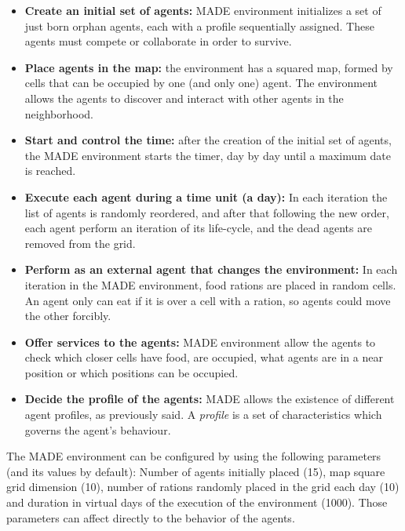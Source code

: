 \documentclass{sig-alternate}
\begin{document}
\begin{itemize}
\item \textbf{Create an initial set of agents:} MADE environment
  initializes a set of just born orphan agents, each with a profile
  sequentially assigned.
 These agents must compete or collaborate in order to survive.
\item \textbf{Place agents in the map:} the environment has a squared map, formed by cells that can be occupied by one (and only one) agent. The environment allows the agents to discover and interact with other agents in the neighborhood.
\item \textbf{Start and control the time:} after the creation of the initial set of agents, the MADE environment starts the timer, day by day until a maximum date is reached.
\item \textbf{Execute each agent during a time unit (a day):} In each iteration the list of agents is randomly reordered, and after that following the new order, each agent perform an iteration of its life-cycle, and the dead agents are removed from the grid.
\item \textbf{Perform as an external agent that changes the environment:} In each iteration in the MADE environment, food rations are placed in random cells. An agent only can eat if it is over a cell with a ration, so agents could move the other forcibly.
\item \textbf{Offer services to the agents:} MADE environment allow the agents to check which closer cells have food, are occupied, what agents are in a near position or which positions can be occupied.
\item \textbf{Decide the profile of the agents:} MADE allows the existence of different agent profiles, as previously said. A {\em profile} is a set of characteristics which governs the agent's behaviour.
\end{itemize}

The MADE environment can be configured by using the following parameters (and its values by default): Number of agents initially placed (15), map square grid dimension (10), number of rations randomly placed in the grid each day (10) and duration in virtual days of the  execution of the environment (1000). Those parameters can affect directly to the behavior of the agents.

\end{document}
